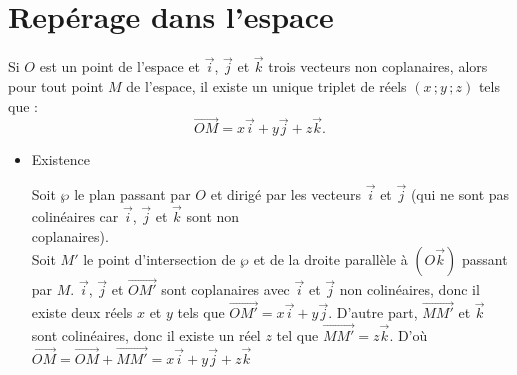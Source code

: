 \documentclass{cornouaille}
\begin{document}
\enlargethispage{1cm}


\section{Repérage dans l'espace}

\begin{theoreme}
  Si $O$ est un point de l'espace et $\overrightarrow{i}$,
  $ \overrightarrow{j}$ et $\overrightarrow{k}$ trois vecteurs non
  coplanaires, alors pour tout point $M$ de l'espace, il existe un
  unique triplet de réels $(x\,;y\,;z)$ tels que :
  \[
  \overrightarrow{OM}=x\overrightarrow{i}+y\overrightarrow{j}+z\overrightarrow{k}.
  \]
\end{theoreme}


\newpage

\begin{preuve}
  \begin{itemize}
  \item Existence\\
    \begin{minipage}{.65\linewidth}
      Soit $\wp$ le plan passant par $O$ et dirigé par les vecteurs $\overrightarrow{i}$ et $ \overrightarrow{j}$ (qui ne sont pas colinéaires car $\overrightarrow{i}$, $ \overrightarrow{j}$ et $\overrightarrow{k}$ sont non\\ coplanaires).\\
      Soit $M'$ le point d'intersection de $\wp$ et de la droite
      parallèle à $(O\overrightarrow{k})$ passant par $M$.
      $\overrightarrow{i}$, $ \overrightarrow{j}$ et
      $\overrightarrow{OM'}$ sont coplanaires avec
      $\overrightarrow{i}$ et $ \overrightarrow{j}$ non colinéaires,
      donc il existe deux réels $x$ et $y$ tels que
      $ \overrightarrow{OM'}=x\overrightarrow{i}+y\overrightarrow{j}$.
      D'autre part, $\overrightarrow{MM'}$ et $\overrightarrow{k}$
      sont colinéaires, donc il existe un réel $z$ tel que
      $\overrightarrow{MM'}=z\overrightarrow{k}$.  D'où
      $
      \overrightarrow{OM}=\overrightarrow{OM}+\overrightarrow{MM'}=x\overrightarrow{i}+y\overrightarrow{j}+z\overrightarrow{k}$
    \end{minipage}
    \begin{minipage}{.35\linewidth}

\end{minipage}
\end{itemize}
\end{preuve}
\end{document}
